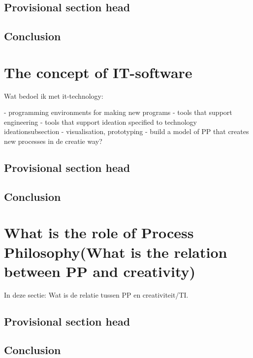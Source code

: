 \documentclass[a4paper]{Thesis}
\begin{document}
\section{Provisional section head}

\section{Conclusion}

\chapter{The concept of IT-software}
Wat bedoel ik met it-technology:

- programming environments for making new programs
- tools that support engineering
- tools that support ideation specified to technology ideationsubsection{}
- visualisation, prototyping
- build a model of PP that creates new processes in de creatie way?

\section{Provisional section head}
\section{Conclusion}

\chapter{What is the role of Process Philosophy(What is the relation between PP and creativity)}

In deze sectie: Wat is de relatie tussen PP en creativiteit/TI.

\section{Provisional section head}
\section{Conclusion}

\end{document}
